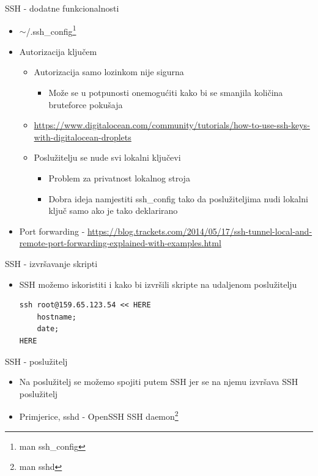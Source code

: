 \documentclass[t]{beamer}
\begin{document}
\begin{frame}{SSH - dodatne funkcionalnosti}
    \begin{itemize}
        \item $\sim$/.ssh\_config\footnote{man ssh\_config}
        \item Autorizacija ključem
        \begin{itemize}
            \item Autorizacija samo lozinkom nije sigurna
            \begin{itemize}
                \item Može se u potpunosti onemogućiti kako bi se smanjila količina bruteforce pokušaja
            \end{itemize}
            \item \url{https://www.digitalocean.com/community/tutorials/how-to-use-ssh-keys-with-digitalocean-droplets}
            \item Poslužitelju se nude svi lokalni ključevi
            \begin{itemize}
                \item Problem za privatnost lokalnog stroja
                \item Dobra ideja namjestiti ssh\_config tako da poslužiteljima nudi lokalni ključ samo ako je tako deklarirano
            \end{itemize}
        \end{itemize}
        \item Port forwarding - \url{https://blog.trackets.com/2014/05/17/ssh-tunnel-local-and-remote-port-forwarding-explained-with-examples.html}
    \end{itemize}
\end{frame}

\begin{frame}[fragile]{SSH - izvršavanje skripti}
    \begin{itemize}
        \item SSH možemo iskoristiti i kako bi izvršili skripte na udaljenom poslužitelju
        \begin{verbatim}
ssh root@159.65.123.54 << HERE
    hostname;
    date;
HERE
        \end{verbatim}
    \end{itemize}
\end{frame}

\begin{frame}{SSH - poslužitelj}
    \begin{itemize}
        \item Na poslužitelj se možemo spojiti putem SSH jer se na njemu izvršava SSH poslužitelj
        \item Primjerice, sshd - OpenSSH SSH daemon\footnote{man sshd}
    \end{itemize}
\end{frame}
\end{document}
